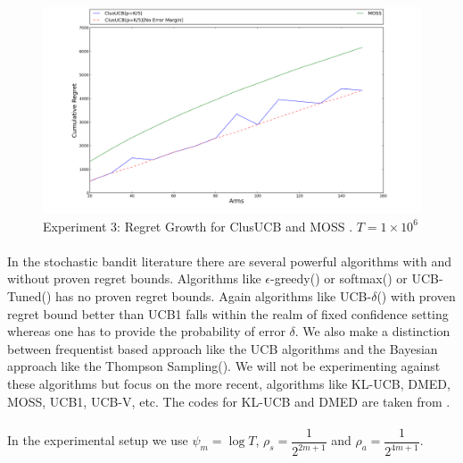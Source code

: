 \hspace{0.1em}

\begin{figure}[!tbp]
\label{fig:3}
\begin{minipage}[b]{0.5\textwidth}
\includegraphics[width=\textwidth]{img/MOSS_ClusUCB_expt3.png}
\caption{Experiment 3: Regret Growth for ClusUCB and MOSS . $T=1\times 10^6$}
\end{minipage}
\end{figure}

\hspace{0.1em}



\paragraph{}In the stochastic bandit literature there are several powerful algorithms with and without proven regret bounds. Algorithms like $\epsilon$-greedy(\cite{sutton1998reinforcement}) or softmax(\cite{sutton1998reinforcement}) or UCB-Tuned(\cite{auer2002finite}) has no proven regret bounds. Again algorithms like UCB-$\delta$(\cite{abbasi2011improved}) with proven regret bound better than UCB1  falls within the realm of fixed confidence setting whereas one has to provide the probability of error $\delta$. We also make a distinction between frequentist based approach like the UCB algorithms and the Bayesian approach like the Thompson Sampling(\cite{agrawal2011analysis}). We will not be experimenting against these algorithms but focus on the more recent, algorithms like KL-UCB, DMED, MOSS, UCB1, UCB-V, etc. The codes for KL-UCB and DMED are taken from \cite{CapGarKau12}.

\paragraph{}In the experimental setup we use $\psi_{m}=\log T$, $\rho_{s}=\dfrac{1}{2^{2m+1}}$ and $\rho_{a}=\dfrac{1}{2^{4m+1}}$.

